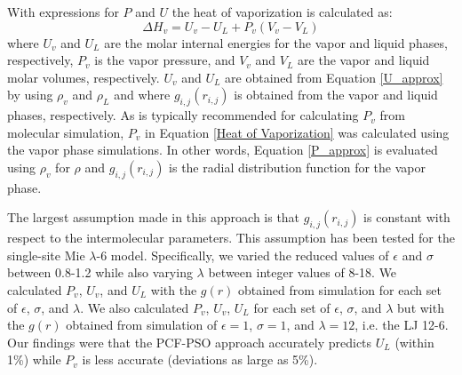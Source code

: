 \documentclass[12pt]{article}
\begin{document}
%
% 
%

With expressions for $P$ and $U$ the heat of vaporization is calculated as:
\begin{equation} \label{Heat of Vaporization}
\Delta H_v = U_v - U_L + P_v (V_v - V_L)
\end{equation}
where $U_v$ and $U_L$ are the molar internal energies for the vapor and liquid phases, respectively, $P_v$ is the vapor pressure, and $V_v$ and $V_L$ are the vapor and liquid molar volumes, respectively. $U_v$ and $U_L$ are obtained from Equation \ref{U_approx} by using $\rho_v$ and $\rho_L$ and where $g_{i,j}(r_{i,j})$ is obtained from the vapor and liquid phases, respectively. As is typically recommended for calculating $P_v$ from molecular simulation, $P_v$ in Equation \ref{Heat of Vaporization} was calculated using the vapor phase simulations. In other words, Equation \ref{P_approx} is evaluated using $\rho_v$ for $\rho$ and $g_{i,j}(r_{i,j})$ is the radial distribution function for the vapor phase.


The largest assumption made in this approach is that $g_{i,j}(r_{i,j})$ is constant with respect to the intermolecular parameters. This assumption has been tested for the single-site Mie $\lambda$-6 model. Specifically, we varied the reduced values of $\epsilon$ and $\sigma$ between 0.8-1.2 while also varying $\lambda$ between integer values of 8-18. We calculated $P_v$, $U_v$, and $U_L$ with the $g(r)$ obtained from simulation for each set of $\epsilon$, $\sigma$, and $\lambda$. We also calculated $P_v$, $U_v$, $U_L$ for each set of $\epsilon$, $\sigma$, and $\lambda$ but with the $g(r)$ obtained from simulation of $\epsilon=1$, $\sigma=1$, and $\lambda=12$, i.e. the LJ 12-6. Our findings were that the PCF-PSO approach accurately predicts $U_L$ (within 1\%) while $P_v$ is less accurate (deviations as large as 5\%).
\end{document}
